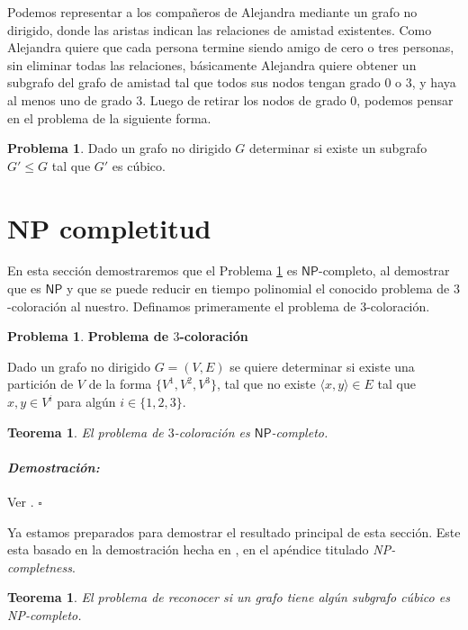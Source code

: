 \documentclass[10pt]{amsart}
\newtheorem{teo}[theorem]{Teorema}
\theoremstyle{definition}
\newtheorem{prob}[theorem]{Problema}
\numberwithin{equation}{section}
\newenvironment{myproof} {\paragraph{\emph{Demostraci\'on:}}}{\hfill$\square$}
\newcommand{\edge}[1]{\langle #1\rangle}
\begin{document}
	Podemos representar a los compa\~neros de Alejandra mediante un grafo no dirigido, donde las aristas indican las relaciones de amistad existentes. Como Alejandra quiere que cada persona termine siendo amigo de cero o tres personas, sin eliminar todas las relaciones, b\'asicamente Alejandra quiere obtener un subgrafo del grafo de amistad tal que todos sus nodos tengan grado $0$ o $3$, y haya al menos uno de grado $3$. Luego de retirar los nodos de grado $0$, podemos pensar en el problema de la siguiente forma.
	
	\begin{prob}\label{rephrased}
		Dado un grafo no dirigido $G$ determinar si existe un subgrafo $G' \le G$ tal que $G'$ es c\'ubico.
	\end{prob}

\section{NP completitud}

En esta secci\'on demostraremos que el Problema \ref{rephrased} es $\mathsf{NP}$-completo, al demostrar que es $\mathsf{NP}$ y que se puede reducir en tiempo polinomial el conocido problema de $3$-coloraci\'on al nuestro. Definamos primeramente el problema de $3$-coloraci\'on.

	\begin{prob} \textbf{Problema de $3$-coloraci\'on}
		
		Dado un grafo no dirigido $G = (V,E)$ se quiere determinar si existe una partici\'on de $V$ de la forma $\{V^1, V^2, V^3\}$, tal que no existe $\edge{x,y} \in E$ tal que $x,y \in V^i$ para alg\'un $i \in \{1,2,3\}$.
		
	\end{prob}

\begin{teo}
	El problema de $3$-coloraci\'on es $\mathsf{NP}$-completo.
\end{teo}

\begin{myproof}
	Ver \cite{3-color}.
\end{myproof}
	
	Ya estamos preparados para demostrar el resultado principal de esta secci\'on. Este esta basado en la demostraci\'on hecha en \cite{trsfrg}, en el ap\'endice titulado \emph{NP-completness}. 

\begin{teo}
	El problema de reconocer si un grafo tiene alg\'un subgrafo c\'ubico es NP-completo.
\end{teo}
\end{document}

